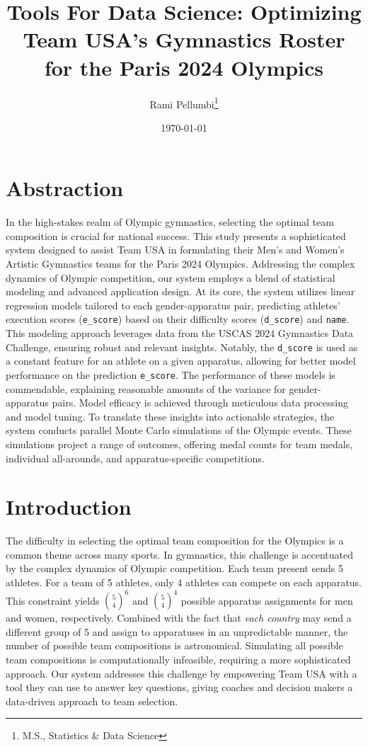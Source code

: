 \documentclass{article}
\title{Tools For Data Science: Optimizing Team USA's Gymnastics Roster for the Paris 2024 Olympics}
\author{Rami Pellumbi\thanks{M.S., Statistics \& Data Science}}
\date{\today}
\begin{document}
\maketitle
\newpage
\section{Abstraction}
In the high-stakes realm of Olympic gymnastics, selecting the optimal team 
composition is crucial for national success. This study presents a 
sophisticated system designed to assist Team USA in formulating their Men's 
and Women's Artistic Gymnastics teams for the Paris 2024 Olympics. Addressing 
the complex dynamics of Olympic competition, our system employs a blend 
of statistical modeling and advanced application design. 
At its core, the system utilizes linear regression models tailored 
to each gender-apparatus pair, predicting athletes' execution scores (\texttt{e\_score}) 
based on their difficulty scores (\texttt{d\_score}) and \texttt{name}. 
This modeling approach leverages data from the USCAS 2024 Gymnastics Data 
Challenge, ensuring robust and relevant insights. Notably, 
the \texttt{d\_score} is used as a constant feature for an athlete on a given 
apparatus, allowing for better model performance on the prediction \texttt{e\_score}.
The performance of these models is commendable, explaining 
reasonable amounts of the variance for gender-apparatus pairs. Model efficacy is 
achieved through meticulous data processing and model tuning.
To translate these insights into actionable strategies, the system 
conducts parallel Monte Carlo simulations of the Olympic events. These simulations 
project a range of outcomes, offering medal counts for team medals, 
individual all-arounds, and apparatus-specific competitions.

\section{Introduction}
The difficulty in selecting the optimal team composition for the Olympics 
is a common theme across many sports. In gymnastics, this challenge is 
accentuated by the complex dynamics of Olympic competition. Each team present 
sends 5 athletes. For a team of 5 athletes, only 4 athletes can compete on each apparatus. 
This constraint yields ${5 \choose 4}^6$ and ${5 \choose 4}^4$ possible apparatus assignments for 
men and women, respectively. Combined with the fact that \textit{each country} may 
send a different group of 5 and assign to apparatuses in an unpredictable manner, 
the number of possible team compositions is astronomical. 
Simulating all possible team compositions is computationally infeasible, 
requiring a more sophisticated approach. Our system addresses this challenge 
by empowering Team USA with a tool they can use to answer key questions, 
giving coaches and decision makers a data-driven approach to team selection.
\end{document}

